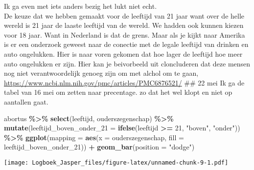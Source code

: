 \documentclass[
]{article}
\newenvironment{Shaded}{\begin{snugshade}}{\end{snugshade}}
\newcommand{\AttributeTok}[1]{\textcolor[rgb]{0.13,0.29,0.53}{#1}}
\newcommand{\DecValTok}[1]{\textcolor[rgb]{0.00,0.00,0.81}{#1}}
\newcommand{\FunctionTok}[1]{\textcolor[rgb]{0.13,0.29,0.53}{\textbf{#1}}}
\newcommand{\NormalTok}[1]{#1}
\newcommand{\SpecialCharTok}[1]{\textcolor[rgb]{0.81,0.36,0.00}{\textbf{#1}}}
\newcommand{\StringTok}[1]{\textcolor[rgb]{0.31,0.60,0.02}{#1}}
\begin{document}
Ik ga even met iets anders bezig het lukt niet echt.\\
De keuze dat we hebben gemaakt voor de leeftijd van 21 jaar want over de
helle wereld is 21 jaar de laaste leeftijd van de wereld. We hadden ook
kunnen kiezen voor 18 jaar. Want in Nederland is dat de grens. Maar als
je kijkt naar Amerika is er een onderzoek geweest naar de conectie met
de legale leeftijd van drinken en auto ongelukken. Hier is naar voren
gekomen dat hoe lager de leeftijd hoe meer auto ongelukken er zijn. Hier
kan je beivorbeeld uit cloncluderen dat deze mensen nog niet
verantwoordelijk genoeg zijn om met alchol om te gaan,
\url{https://www.ncbi.nlm.nih.gov/pmc/articles/PMC6876521/} \#\# 22 mei
Ik ga de tabel van 16 mei om zetten naar precentage. zo dat het wel
klopt en niet op aantallen gaat.

\begin{Shaded}
\begin{Highlighting}[]
\NormalTok{abortus }\SpecialCharTok{\%\textgreater{}\%}
    \FunctionTok{select}\NormalTok{(leeftijd, ouderszegenschap) }\SpecialCharTok{\%\textgreater{}\%}
    \FunctionTok{mutate}\NormalTok{(}\AttributeTok{leeftijd\_boven\_onder\_21 =} \FunctionTok{ifelse}\NormalTok{(leeftijd }\SpecialCharTok{\textgreater{}=} \DecValTok{21}\NormalTok{, }\StringTok{"boven"}\NormalTok{, }\StringTok{"onder"}\NormalTok{)) }\SpecialCharTok{\%\textgreater{}\%}
    \FunctionTok{ggplot}\NormalTok{(}\AttributeTok{mapping =} \FunctionTok{aes}\NormalTok{(}\AttributeTok{x =}\NormalTok{ ouderszegenschap, }\AttributeTok{fill =}\NormalTok{ leeftijd\_boven\_onder\_21)) }\SpecialCharTok{+}
    \FunctionTok{geom\_bar}\NormalTok{(}\AttributeTok{position =} \StringTok{"dodge"}\NormalTok{)}
\end{Highlighting}
\end{Shaded}

\texttt{[image: Logboek\_Jasper\_files/figure-latex/unnamed-chunk-9-1.pdf]}
\end{document}
